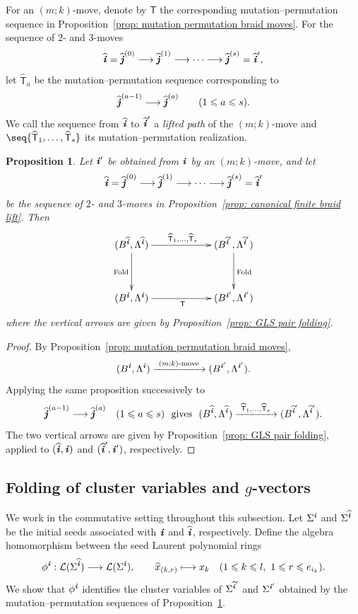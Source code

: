 \documentclass[12pt, leqno]{amsart}
\numberwithin{equation}{section}
\theoremstyle{plain}
\newtheorem{proposition}[lemma]{Proposition}
\theoremstyle{definition}
\renewcommand{\le}{\leqslant}
\newcommand{\ii}{ \textbf{\textit{i}}}
\newcommand{\jj}{ \textbf{\textit{j}}}
\newcommand{\hx}{\widehat{x}}
\newcommand{\hii}{{\widehat{\ii}}}
\newcommand{\hjj}{{\widehat{\jj}}}
\newcommand{\sfT}{\mathsf{T}}
\newcommand{\hsfT}{\widehat{\sfT}}
\newcommand{\calL}{\mathcal{L}}
\begin{document}
For an $(m;k)$-move, denote by $\sfT$ the corresponding
mutation--permutation sequence in Proposition~\ref{prop: mutation permutation braid moves}.
 For the sequence of $2$- and $3$-moves{}
\[
\hii=\hjj^{(0)}\longrightarrow\hjj^{(1)} \longrightarrow\cdots\longrightarrow\hjj^{(s)}=\hii',
\]
let $\hsfT_a$ be the mutation--permutation sequence
corresponding to
\[
\hjj^{(a-1)}\longrightarrow\hjj^{(a)}   \qquad(1\le a\le s).
\]
We call the sequence from $\hii$ to $\hii'$ a \emph{lifted path}
of the $(m;k)$-move and $\seq{\hsfT_1,\ldots,\hsfT_s}$ its
mutation--permutation realization.

\begin{proposition}\label{prop: endpoint braid folding}
Let $\ii'$ be obtained from $\ii$ by an $(m;k)$-move, and let
\[
\hii=\hjj^{(0)}   \longrightarrow\hjj^{(1)}   \longrightarrow\cdots\longrightarrow  \hjj^{(s)}=\hii'
\]
 be the sequence of $2$- and $3$-moves in
Proposition~\ref{prop: canonical finite braid lift}.{}
Then
\[
\xymatrix@C=60pt@R=35pt{
(B^\hii,\Lambda^\hii)   \ar[r]^{\hsfT_1,\ldots,\hsfT_s}   \ar[d]_{\mathrm{Fold}} & (B^{\hii'},\Lambda^{\hii'})   \ar[d]^{\mathrm{Fold}}\\
(B^\ii,\Lambda^\ii)   \ar[r]_{ \sfT} & (B^{\ii'},\Lambda^{\ii'})
}
\]
where the vertical arrows are given by
Proposition~\ref{prop: GLS pair folding}.
\end{proposition}

\begin{proof}
By Proposition~\ref{prop: mutation permutation braid moves},
\[
(B^\ii,\Lambda^\ii) \xrightarrow{\ (m;k)\text{-move}\ } (B^{\ii'},\Lambda^{\ii'}).
\]
Applying the same proposition successively to
\[
\hjj^{(a-1)}\longrightarrow\hjj^{(a)} \quad(1\le a\le s)
\ \text{ gives } \
(B^\hii,\Lambda^\hii) \xrightarrow{\ \hsfT_1,\ldots,\hsfT_s\ } (B^{\hii'},\Lambda^{\hii'}).
\]
 The two vertical arrows are given by{}
Proposition~\ref{prop: GLS pair folding}, applied to
$(\hii,\ii)$ and $(\hii',\ii')$, respectively.
\end{proof}

\subsection{Folding of cluster variables and $g$-vectors}

We work in the commutative setting throughout this subsection.
Let $\Sigma^\ii$ and $\Sigma^\hii$ be  the initial seeds associated with 
$\ii$ and $\hii$, respectively. Define the algebra homomorphism between the seed Laurent polynomial rings
\[
\phi^\ii:\calL(\Sigma^\hii)\longrightarrow\calL(\Sigma^\ii),  \qquad
\hx_{(k,r)}\longmapsto x_k  \quad  (1\le k\le l,\ 1\le r\le e_{i_k}).
\]
We show that $\phi^\ii$ identifies  the cluster variables of $\Sigma^{\hii'}$ and $\Sigma^{\ii'}$
obtained by the mutation--permutation sequences of
Proposition~\ref{prop: endpoint braid folding}.
\end{document}
